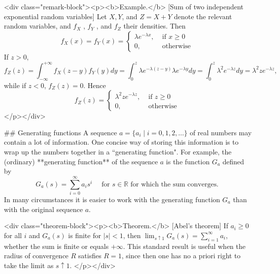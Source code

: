 <div class="remark-block"><p><b>Example.</b> [Sum of two independent exponential random variables]
Let $X, Y$, and $Z = X + Y$ denote the relevant random variables, and $f_X$ , $f_Y$ , and $f_Z$ their densities. Then
$$\begin{equation}
    f_{X}(x)=f_{Y}(x)=\left\{\begin{array}{ll}{\lambda e^{-\lambda x},} & {\text { if } x \geq 0} \\ {0,} & {\text { otherwise }}\end{array}\right.
\end{equation}$$
If $z > 0$,
$$\begin{equation}
    f_{Z}(z)=\int_{-\infty}^{+\infty} f_{X}(z-y) f_{Y}(y) d y =\int_{0}^{z} \lambda e^{-\lambda(z-y)} \lambda e^{-\lambda y} d y =\int_{0}^{z} \lambda^{2} e^{-\lambda z} d y =\lambda^{2} z e^{-\lambda z},
\end{equation}$$
while if $z < 0$, $f_Z(z) = 0$. Hence 
$$\begin{equation}
    f_{Z}(z)=\left\{\begin{array}{ll}{\lambda^{2} z e^{-\lambda z},} & {\text { if } z \geq 0} \\ {0,} & {\text { otherwise }}\end{array}\right.
\end{equation}$$
</p></div>


## Generating functions
A sequence $a = \{a_i \;\vert\; i = 0, 1 , 2, \dots \}$ of real numbers may contain a lot of information. One concise way of storing this information is to wrap up the numbers together in a ``generating function". For example, the (ordinary) **generating function** of the sequence $a$ is the function $G_a$ defined by 
$$\begin{equation}
    G_{a}(s)=\sum_{i=0}^{\infty} a_{i} s^{i} \quad \text { for } s \in \mathbb{R} \text { for which the sum converges. }
\end{equation}$$
In many circumstances it is easier to work with the generating function $G_a$ than with the original sequence $a$.

<div class="theorem-block"><p><b>Theorem.</b> [Abel's theorem]
If $a_i \geq 0$ for all $i$ and $G_a(s)$ is finite for $\left\vert s \right\vert < 1$, then $\lim_{s \uparrow 1} G_a (s) = \sum_{i=1}^ \infty a_i$, whether the sum is finite or equals $+\infty$. This standard result is useful when the radius of convergence $R$ satisfies $R = 1$, since then one has no a priori right to take the limit as $s \uparrow 1$.
</p></div>


